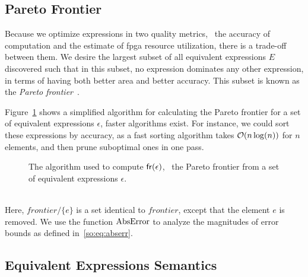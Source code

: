 \subsection{Pareto Frontier}
\label{so:sub:pareto}

Because we optimize expressions in two quality metrics, \ie~the accuracy of
computation and the estimate of \gls{fpga} resource utilization, there is
a trade-off between them. We desire the largest subset of all equivalent
expressions $E$ discovered such that in this subset, no expression dominates
any other expression, in terms of having both better area and better
accuracy. This subset is known as the \emph{Pareto frontier}~\cite{legriel10}.

Figure~\ref{so:alg:pareto} shows a simplified algorithm for calculating
the Pareto frontier for a set of equivalent expressions $\epsilon$, faster
algorithms exist.  For instance, we could sort these expressions by accuracy,
as a fast sorting algorithm takes $\operatorname{\mathcal{O}}(n\log(n))$ for $n$ elements, and then
prune suboptimal ones in one pass.
\begin{figure}[ht]
    \centering
    \begin{algorithmic}
                    \EndIf{}
                \EndFor{}
            \EndFor{}
        \EndFunction%
    \end{algorithmic}
    \caption{%
        The algorithm used to compute $\operatorname{\mathsf{fr}}(\epsilon)$, \ie~the Pareto
        frontier from a set of equivalent expressions $\epsilon$.
    }\label{so:alg:pareto}
\end{figure} \\
Here, $\mathit{frontier} / \{ e \}$ is a set identical to $\mathit{frontier}$,
except that the element $e$ is removed.  We use the function $\operatorname{\mathrm{AbsError}}$ to
analyze the magnitudes of error bounds as defined in~\eqref{so:eq:abserr}.


\subsection{Equivalent Expressions Semantics}
\label{so:sub:equivalent_semantics}

